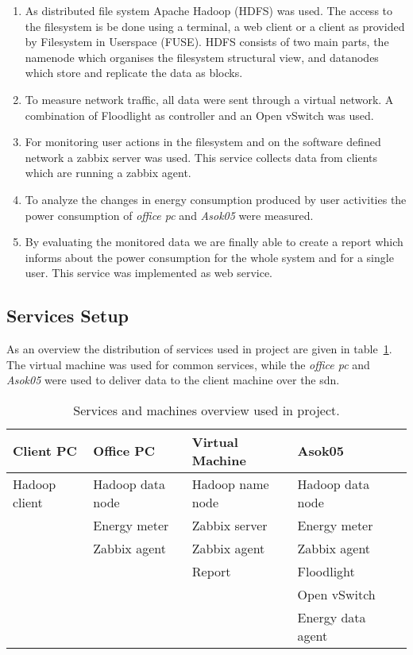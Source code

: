 \begin{enumerate}

\item As distributed file system Apache Hadoop (HDFS) was used. The access to the filesystem is be done using a terminal, a web client or a client as provided by Filesystem in Userspace (FUSE). HDFS consists of two main parts, the namenode which organises the filesystem structural view, and datanodes which store and replicate the data as blocks.

\item To measure network traffic, all data were sent through a virtual network. A combination of Floodlight as controller and an Open vSwitch was used. 

\item For monitoring user actions in the filesystem and on the software defined network a zabbix server was used. This service collects data from clients which are running a zabbix agent.

\item To analyze the changes in energy consumption produced by user activities the power consumption of \textit{office pc} and \textit{Asok05} were measured.

\item By evaluating the monitored data we are finally able to create a  report which informs about the power consumption for the whole system and for a single user. This service was implemented as web service.

\end{enumerate}

\subsection{Services Setup}

As an overview the distribution of services used in project are given in table~\ref{tab:services}. The virtual machine was used for common services, while the \textit{office pc} and \textit{Asok05} were used to deliver data to the client machine over the sdn.

\begin{table}[b]
	\centering
	\caption{Services and machines overview used in project. }
	\begin{tabular}{|l|l|l|l|l|}
		\hline \rule[-2ex]{0pt}{5.5ex} \textbf{Client PC} & \textbf{Office PC} & \textbf{Virtual Machine} & \textbf{Asok05} \\ 
		\hline \rule[-2ex]{0pt}{5.5ex} Hadoop client & Hadoop data node & Hadoop name node & Hadoop data node \\ 
		       \rule[-2ex]{0pt}{5.5ex}  & Energy meter & Zabbix server & Energy meter \\ 
		       \rule[-2ex]{0pt}{5.5ex}  & Zabbix agent & Zabbix agent & Zabbix agent \\ 
		       \rule[-2ex]{0pt}{5.5ex}  &  & Report & Floodlight \\ 
		       \rule[-2ex]{0pt}{5.5ex}  &  &  & Open vSwitch \\ 
		       \rule[-2ex]{0pt}{5.5ex}  &  &  & Energy data agent \\ 
		\hline 
	\end{tabular}
	\label{tab:services}
\end{table}
